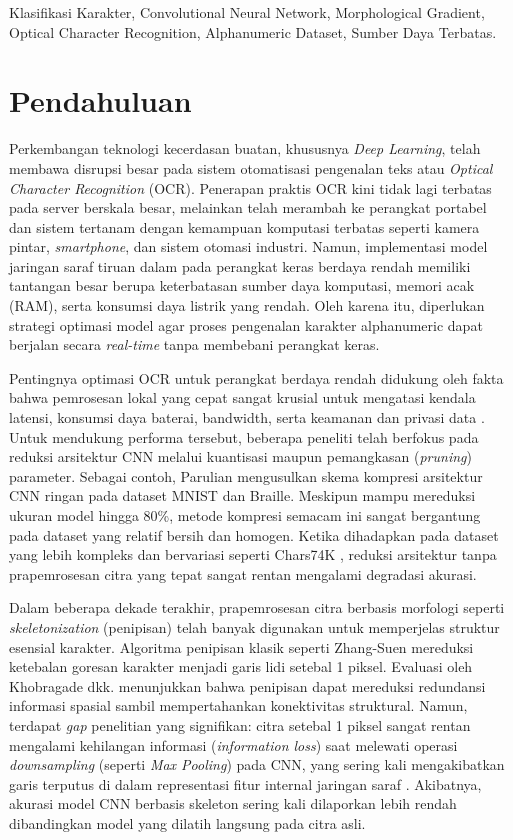 \documentclass[journal]{IEEEtran}
\begin{document}
\begin{IEEEkeywords}
Klasifikasi Karakter, Convolutional Neural Network, Morphological Gradient, Optical Character Recognition, Alphanumeric Dataset, Sumber Daya Terbatas.
\end{IEEEkeywords}

\section{Pendahuluan}
Perkembangan teknologi kecerdasan buatan, khususnya \textit{Deep Learning}, telah membawa disrupsi besar pada sistem otomatisasi pengenalan teks atau \textit{Optical Character Recognition} (OCR). Penerapan praktis OCR kini tidak lagi terbatas pada server berskala besar, melainkan telah merambah ke perangkat portabel dan sistem tertanam dengan kemampuan komputasi terbatas seperti kamera pintar, \textit{smartphone}, dan sistem otomasi industri. Namun, implementasi model jaringan saraf tiruan dalam pada perangkat keras berdaya rendah memiliki tantangan besar berupa keterbatasan sumber daya komputasi, memori acak (RAM), serta konsumsi daya listrik yang rendah. Oleh karena itu, diperlukan strategi optimasi model agar proses pengenalan karakter alphanumeric dapat berjalan secara \textit{real-time} tanpa membebani perangkat keras.

Pentingnya optimasi OCR untuk perangkat berdaya rendah didukung oleh fakta bahwa pemrosesan lokal yang cepat sangat krusial untuk mengatasi kendala latensi, konsumsi daya baterai, bandwidth, serta keamanan dan privasi data \cite{sandler2018mobilenetv2}. Untuk mendukung performa tersebut, beberapa peneliti telah berfokus pada reduksi arsitektur CNN melalui kuantisasi maupun pemangkasan (\textit{pruning}) parameter. Sebagai contoh, Parulian \cite{parulian2025efficient} mengusulkan skema kompresi arsitektur CNN ringan pada dataset MNIST dan Braille. Meskipun mampu mereduksi ukuran model hingga 80\%, metode kompresi semacam ini sangat bergantung pada dataset yang relatif bersih dan homogen. Ketika dihadapkan pada dataset yang lebih kompleks dan bervariasi seperti Chars74K \cite{decampos2009character}, reduksi arsitektur tanpa prapemrosesan citra yang tepat sangat rentan mengalami degradasi akurasi.

Dalam beberapa dekade terakhir, prapemrosesan citra berbasis morfologi seperti \textit{skeletonization} (penipisan) telah banyak digunakan untuk memperjelas struktur esensial karakter. Algoritma penipisan klasik seperti Zhang-Suen \cite{zhang1984fast} mereduksi ketebalan goresan karakter menjadi garis lidi setebal 1 piksel. Evaluasi oleh Khobragade dkk. \cite{khobragade2014evaluations} menunjukkan bahwa penipisan dapat mereduksi redundansi informasi spasial sambil mempertahankan konektivitas struktural. Namun, terdapat \textit{gap} penelitian yang signifikan: citra setebal 1 piksel sangat rentan mengalami kehilangan informasi (\textit{information loss}) saat melewati operasi \textit{downsampling} (seperti \textit{Max Pooling}) pada CNN, yang sering kali mengakibatkan garis terputus di dalam representasi fitur internal jaringan saraf \cite{shi2022rcrn}. Akibatnya, akurasi model CNN berbasis skeleton sering kali dilaporkan lebih rendah dibandingkan model yang dilatih langsung pada citra asli.
\end{document}

